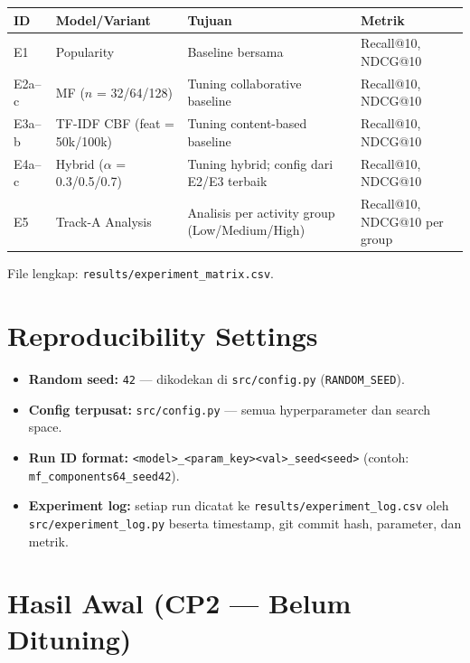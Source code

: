 \documentclass[10pt,a4paper]{article}
\begin{document}
\begin{table}[h!]
\centering
\begin{tabular}{@{}llll@{}}
\toprule
\textbf{ID} & \textbf{Model/Variant} & \textbf{Tujuan} & \textbf{Metrik} \\
\midrule
E1      & Popularity                    & Baseline bersama                              & Recall@10, NDCG@10 \\
E2a--c  & MF ($n$ = 32/64/128)          & Tuning collaborative baseline                 & Recall@10, NDCG@10 \\
E3a--b  & TF-IDF CBF (feat = 50k/100k)  & Tuning content-based baseline                 & Recall@10, NDCG@10 \\
E4a--c  & Hybrid ($\alpha$ = 0.3/0.5/0.7) & Tuning hybrid; config dari E2/E3 terbaik    & Recall@10, NDCG@10 \\
E5      & Track-A Analysis              & Analisis per activity group (Low/Medium/High) & Recall@10, NDCG@10 per group \\
\bottomrule
\end{tabular}
\end{table}

File lengkap: \texttt{results/experiment\_matrix.csv}.

\section{Reproducibility Settings}

\begin{itemize}[leftmargin=*, nosep]
  \item \textbf{Random seed:} \texttt{42} --- dikodekan di \texttt{src/config.py} (\texttt{RANDOM\_SEED}).
  \item \textbf{Config terpusat:} \texttt{src/config.py} --- semua hyperparameter dan search space.
  \item \textbf{Run ID format:} \texttt{<model>\_<param\_key><val>\_seed<seed>}
        (contoh: \texttt{mf\_components64\_seed42}).
  \item \textbf{Experiment log:} setiap run dicatat ke \texttt{results/experiment\_log.csv}
        oleh \texttt{src/experiment\_log.py} beserta timestamp, git commit hash, parameter, dan metrik.
\end{itemize}

\section{Hasil Awal (CP2 --- Belum Dituning)}
\end{document}
